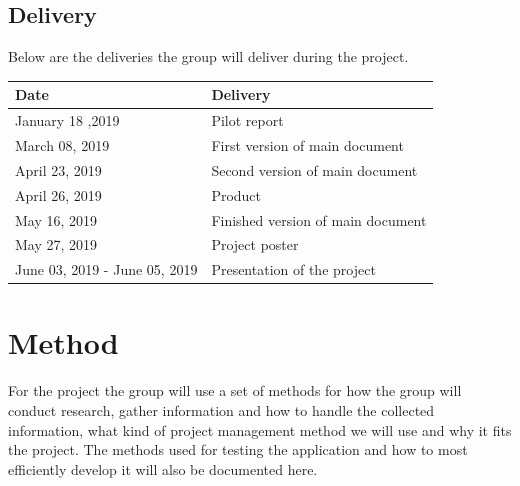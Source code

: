 


\subsection{Delivery}

Below are the deliveries the group will deliver during the project.
\begin{tabu} to 1.2\textwidth { | X[l] | X[c] | }
    \hline
    \textbf{Date} & \textbf{Delivery} \\
    \hline
    January 18 ,2019 & Pilot report \\
    \hline
    March 08, 2019 & First version of main document \\
    \hline
    April 23, 2019 & Second version of main document \\
    \hline
    April 26, 2019 & Product \\
    \hline
    May 16, 2019 & Finished version of main document \\
    \hline
    May 27, 2019 & Project poster \\
    \hline
   June 03, 2019 - June 05, 2019 & Presentation of the project \\
    \hline
\end{tabu}
    
\section{Method} 
For the project the group will use a set of methods for how the group will conduct research, gather information and how to handle the collected information, what kind of project management method we will use and why it fits the project. The methods used for testing the application and how to most efficiently develop it will also be documented here. 

